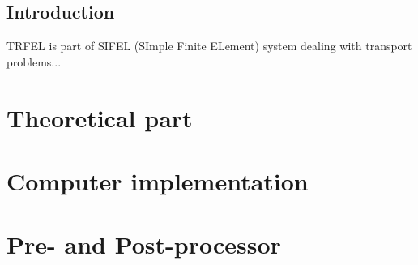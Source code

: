 \documentclass[12pt]{book}
\begin{document}
\tableofcontents
\chapter{Introduction}
TRFEL is part of SIFEL (SImple Finite ELement) system dealing with
transport problems...


\part{Theoretical part}




\part{Computer implementation}





\printindex
\part{Pre- and Post-processor}



\end{document}
